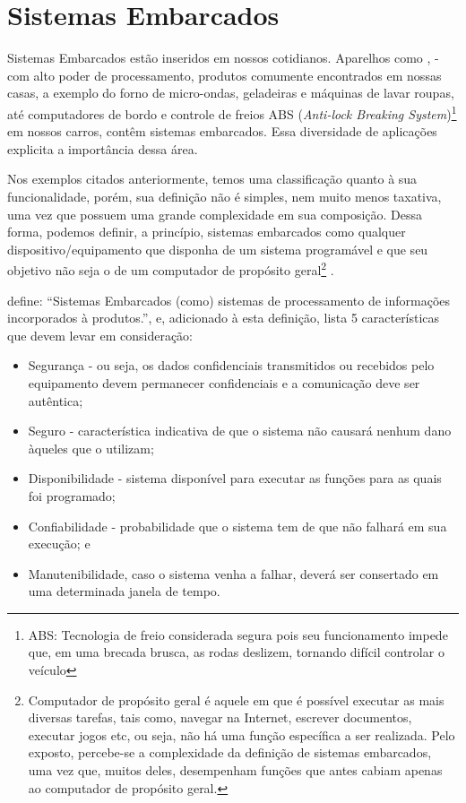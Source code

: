 \section{Sistemas Embarcados}\label{sec:sistemas-embarcados}

Sistemas Embarcados estão inseridos em nossos cotidianos. Aparelhos como
\smartphones[], \tablets[] - com alto poder de processamento,
produtos comumente encontrados em nossas casas, a exemplo do forno de 
micro-ondas, geladeiras e máquinas de lavar roupas, até computadores de bordo e
controle de freios ABS (\textit{Anti-lock Breaking System})\footnote{ABS:
Tecnologia  de freio considerada segura pois seu funcionamento impede que, em
uma brecada brusca, as rodas  deslizem, tornando difícil controlar o veículo} em
nossos carros, contêm sistemas embarcados. Essa diversidade de aplicações
explicita a importância dessa área.

Nos exemplos citados anteriormente, temos uma classificação quanto à sua
funcionalidade, porém, sua definição não é simples, nem muito menos taxativa,
uma vez que possuem uma grande complexidade em sua composição. Dessa forma,
podemos definir, a princípio, sistemas embarcados como qualquer
dispositivo/equipamento que disponha de um sistema programável e que seu
objetivo não seja o de um computador de propósito geral\footnote{Computador de
propósito geral é aquele em que é possível executar as mais diversas tarefas,
tais como, navegar na Internet, escrever documentos, executar jogos etc, ou
seja, não há uma função específica a ser realizada. Pelo exposto, percebe-se a
complexidade da definição de sistemas embarcados, uma vez que, muitos deles, 
desempenham funções que antes cabiam apenas ao computador de propósito geral.}
\cite{wolf2012computers}.

 define: ``Sistemas Embarcados (como) sistemas
de processamento de informações incorporados à produtos.'', e, adicionado à
esta definição, lista 5 características que devem levar em consideração: 

\begin{itemize}
  \item Segurança - ou seja, os dados confidenciais transmitidos ou recebidos pelo
  equipamento devem permanecer confidenciais e a comunicação deve ser autêntica;
  \item Seguro - característica indicativa de que o sistema não causará nenhum dano àqueles que o utilizam;
  \item Disponibilidade - sistema disponível para executar as funções para as quais
  foi programado; 
  \item Confiabilidade - probabilidade que o sistema tem de que não
  falhará em sua execução; e
  \item Manutenibilidade, caso o sistema venha a falhar, deverá 
  ser consertado em uma determinada janela de tempo.
\end{itemize}

